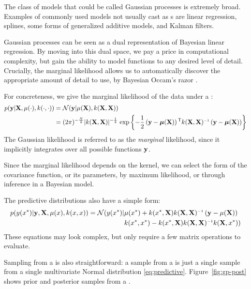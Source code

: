 The class of models that could be called Gaussian processes is extremely broad.
Examples of commonly used models not usually cast as \gp{}s are linear regression, splines, some forms of generalized additive models, and Kalman filters.

Gaussian processes can be seen as a dual representation of Bayesian linear regression. 
By moving into this dual space, we pay a price in computational complexity, but gain the ability to model functions to any desired level of detail.
Crucially, the marginal likelihood allows us to automatically discover the appropriate amount of detail to use, by Bayesian Occam's razor \citep{rasmussen2001occam,mackay2003information}.

For concreteness, we give the marginal likelihood of the data under a \gp{}:
%
\begin{align}
p(\vy | \vX, \mu(\cdot), k(\cdot, \cdot)) & = \N{\vy}{\mu(\vX)}{k(\vX, \vX)} \nonumber\\
& = (2\pi)^{-\frac{N}{2}}|k(\vX, \vX)|^{-\frac{1}{2}}\, \exp \left\{ -\frac{1}{2} \left( \vy - \boldsymbol\mu(\vX) \right)\tra k(\vX, \vX)\inv \left(\vy - \boldsymbol\mu(\vX) \right) \right\}
\label{eq:gp_marg_lik}
\end{align}
%
The Gaussian likelihood is referred to as the \emph{marginal} likelihood, since it implicitly integrates over all possible functions ${\bf{y}}$.

Since the marginal likelihood depends on the kernel, we can select the form of the covariance function, or its parameters, by maximum likelihood, or through inference in a Bayesian model.

The predictive distributions also have a simple form:
%
\begin{align}
p( y(\iva^*) | \vy, \vX, \mu(\iva), k(\iva, \iva)) = \mathcal{N} \large( y(\iva^*) | & \mu(\iva^*) + k(\iva^*, \vX) k(\vX, \vX)\inv \left( \vy - \mu(\vX) \right)  \nonumber \\
& k(\iva^*, \iva^*) - k(\iva^*, \vX) k(\vX, \vX)\inv k(\vX, \iva^*) \large)
\label{eq:predictive}
\end{align}
%
These equations may look complex, but only require a few matrix operations to evaluate.

Sampling from a \gp{} is also straightforward: a sample from a \gp{} is just a single sample from a single multivariate Normal distribution \eqref{eq:predictive}.
Figure~\ref{fig:gp-post} shows prior and posterior samples from a \gp{}.



